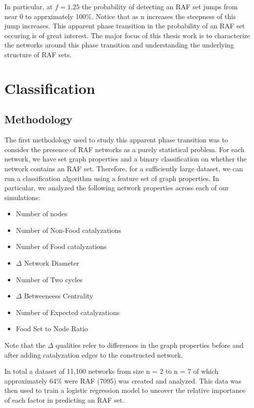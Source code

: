\documentclass[11pt]{article}
\begin{document}
In particular, at $f =1.25$ the probability of detecting an RAF set jumps from near 0 to apprximately 100\%. 
Notice that as n increases the steepness of this jump increases. 
This apparent phase transition in the probability of an RAF set occuring is of great interest. 
The major focus of this thesis work is to characterize the networks around this phase transition and understanding the underlying structure of RAF sets.

\section{Classification}


\subsection{Methodology}

The first methodology used to study this apparent phase transition was to consider the presence of RAF networks as a purely statistical problem. 
For each network, we have set graph properties and a binary classification on whether the network contains an RAF set. 
Therefore, for a sufficiently large dataset, we can run a classification algorithm using a feature set of graph properties. 
In particular, we analyzed the following network properties across each of our simulations:

\begin{itemize}
        \item Number of nodes
        \item Number of Non-Food catalyzations
        \item Number of Food catalyzations
        \item $\Delta$ Network Diameter
        \item Number of Two cycles
        \item  $\Delta$ Betweeneess Centrality
        \item Number of Expected catalyzations
        \item Food Set to Node Ratio
\end{itemize}

Note that the $\Delta$ qualities refer to differences in the graph properties before and after adding catalyzation edges to the constructed network.


In total a dataset of 11,100 networks from size n = 2 to n = 7 of which approximately 64\% were RAF (7095) was created and analyzed.
This data was then used to train a logistic regression model to uncover the relative importance of each factor in predicting an RAF set.
\end{document}
